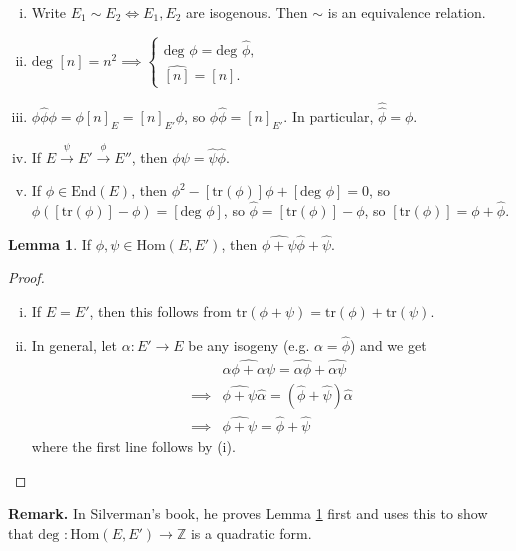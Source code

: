 \documentclass{article}
\theoremstyle{definition}
\newtheorem{lemma}[theorem]{Lemma}
\begin{document}
\begin{enumerate}[(i)]
    \item Write $E_1 \sim E_2 \iff E_1,E_2$ are isogenous. Then $\sim$ is an equivalence relation.
    \item $\text{deg }[n] = n^2 \implies  \begin{cases}
        \text{deg }\phi = \text{deg }\widehat{\phi},\\
        \widehat{[n]} = [n].
    \end{cases}$ 
    \item $\phi \widehat{\phi}\phi = \phi[n]_E = [n]_{E'}\phi$, so $\phi\widehat{\phi}=[n]_{E'}$. In particular, $\widehat{\widehat{\phi}}=\phi$.
    \item If $E \stackrel{\psi}{\to} E' \stackrel{\phi}{\to} E''$, then $\widehat{\phi \psi} = \widehat{\psi}\widehat{\phi}$.
    \item If $\phi \in \text{End}(E)$, then $\phi^2-[\text{tr}(\phi)]\phi + [\text{deg }\phi]=0$, so $\phi([\text{tr}(\phi)]-\phi) = [\text{deg }\phi]$, so $\widehat{\phi} = [\text{tr}(\phi)]-\phi$, so $[\text{tr}(\phi)] = \phi + \widehat{\phi}$.
\end{enumerate} 
\begin{lemma}\label{lemma14.3}
    If $\phi,\psi \in \text{Hom}(E,E')$, then $\widehat{\phi+\psi}\widehat{\phi}+\widehat{\psi}$.
\end{lemma}
\begin{proof}
    \begin{enumerate}[(i)]
        \item If $E = E'$, then this follows from $\text{tr}(\phi+\psi)=\text{tr}(\phi)+\text{tr}(\psi)$.
        \item In general, let $\alpha : E' \to E$ be any isogeny (e.g. $\alpha = \widehat{\phi}$) and we get
        \begin{align*}
            &\widehat{\alpha \phi + \alpha \psi} = \widehat{\alpha \phi} + \widehat{\alpha \psi}\\
            \implies &\widehat{\phi+\psi}\widehat{\alpha} = (\widehat{\phi}+\widehat{\psi})\widehat{\alpha}\\
            \implies & \widehat{\phi + \psi} = \widehat{\phi}+\widehat{\psi}
        \end{align*}
        where the first line follows by (i).
    \end{enumerate}
\end{proof}
\textbf{Remark.} In Silverman's book, he proves Lemma \ref{lemma14.3} first and uses this to show that $\text{deg }: \text{Hom}(E,E') \to \mathbb{Z}$ is a quadratic form.
\end{document}
